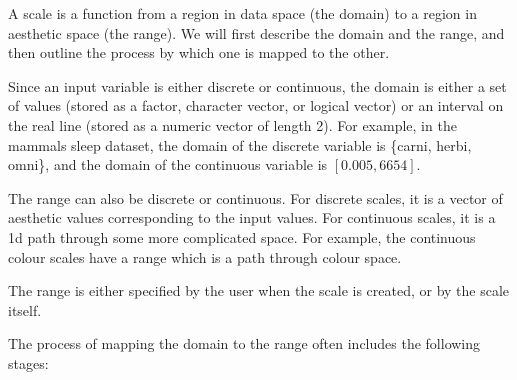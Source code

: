 A scale is a function from a region in data space (the domain) to a region in aesthetic space (the range).  We will first describe the domain and the range, and then outline the process by which one is mapped to the other.

Since an input variable is either discrete or continuous, the domain is either a set of values (stored as a factor, character vector, or logical vector) or an interval on the real line (stored as a numeric vector of length 2). For example, in the mammals sleep dataset, the domain of the discrete variable  is \{carni, herbi, omni\}, and the domain of the continuous variable  is $[0.005, 6654]$.

The range can also be discrete or continuous.  For discrete scales, it is a vector of aesthetic values corresponding to the input values. For continuous scales, it is a 1d path through some more complicated space.  For example, the continuous colour scales have a range which is a path through colour space.

The range is either specified by the user when the scale is created, or by the scale itself.

The process of mapping the domain to the range often includes the following stages:

